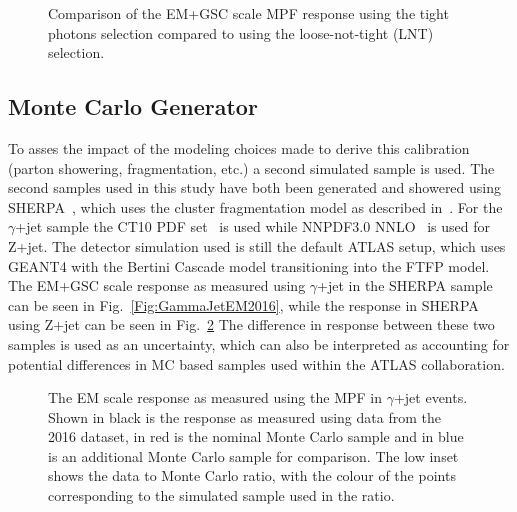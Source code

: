 \begin{figure}[!ht]
 \begin{center}
 \end{center}
 \caption[Response using tight photons compared to using loose-not-tight photons, EM+GSC scale]
 {\small Comparison of the EM+GSC scale MPF response using the tight photons selection compared to using the loose-not-tight (LNT) selection.  }
 \label{fig:RespTightLNTEMGSC}
\end{figure}

\subsection{Monte Carlo Generator}

To asses the impact of the modeling choices made to derive this calibration (parton showering, fragmentation, etc.) a second simulated sample is used.  
The second samples used in this study have both been generated and showered using {\sc SHERPA}~\cite{Gleisberg:2008ta}, which uses the cluster fragmentation model as described in~\cite{1983NuPhB.214..201G}.  
For the $\gamma$+jet sample the CT10 PDF set~\cite{Lai:2010vv} is used while NNPDF3.0 NNLO~\cite{Ball:2014uwa} is used for Z+jet.  
The detector simulation used is still the default ATLAS setup, which uses GEANT4 with the Bertini Cascade model transitioning into the FTFP model.   
The EM+GSC scale response as measured using $\gamma$+jet in the {\sc SHERPA} sample can be seen in Fig.~\ref{Fig:GammaJetEM2016}, while the response in {\sc SHERPA} using Z+jet can be seen in Fig.~\ref{Fig:ZJetEM2016}
The difference in response between these two samples is used as an uncertainty, which can also be interpreted as accounting for potential differences in MC based samples used within the ATLAS collaboration.  

\begin{figure}[!ht]
 \begin{center}
 \end{center}
 \caption[EM scale response using Z+jet in 2016]
 {\small The EM scale response as measured using the MPF in $\gamma$+jet events.  Shown in black is the response as measured using data from the 2016 dataset, in red is the nominal Monte Carlo sample and in blue is an additional Monte Carlo sample for comparison.  The low inset shows the data to Monte Carlo ratio, with the colour of the points corresponding to the simulated sample used in the ratio.  }
 \label{Fig:ZJetEM2016}
\end{figure}

